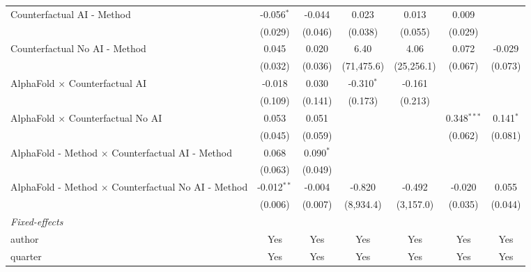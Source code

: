 \begin{tabular}{lcccccc}
   Counterfactual AI - Method                                 & -0.056$^{*}$   & -0.044      & 0.023        & 0.013      & 0.009         &   \\   
                                                              & (0.029)        & (0.046)     & (0.038)      & (0.055)    & (0.029)       &   \\   
   Counterfactual No AI - Method                              & 0.045          & 0.020       & 6.40         & 4.06       & 0.072         & -0.029\\   
                                                              & (0.032)        & (0.036)     & (71,475.6)   & (25,256.1) & (0.067)       & (0.073)\\   
   AlphaFold $\times$ Counterfactual AI                       & -0.018         & 0.030       & -0.310$^{*}$ & -0.161     &               &   \\   
                                                              & (0.109)        & (0.141)     & (0.173)      & (0.213)    &               &   \\   
   AlphaFold $\times$ Counterfactual No AI                    & 0.053          & 0.051       &              &            & 0.348$^{***}$ & 0.141$^{*}$\\   
                                                              & (0.045)        & (0.059)     &              &            & (0.062)       & (0.081)\\   
   AlphaFold - Method $\times$ Counterfactual AI - Method     & 0.068          & 0.090$^{*}$ &              &            &               &   \\   
                                                              & (0.063)        & (0.049)     &              &            &               &   \\   
   AlphaFold - Method $\times$ Counterfactual No AI - Method  & -0.012$^{**}$  & -0.004      & -0.820       & -0.492     & -0.020        & 0.055\\   
                                                              & (0.006)        & (0.007)     & (8,934.4)    & (3,157.0)  & (0.035)       & (0.044)\\   
   \midrule
   \emph{Fixed-effects}\\
   author                                                     & Yes            & Yes         & Yes          & Yes        & Yes           & Yes\\  
   quarter                                                    & Yes            & Yes         & Yes          & Yes        & Yes           & Yes\\  

\end{tabular}
